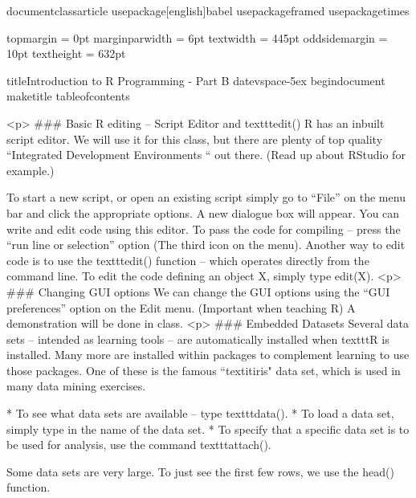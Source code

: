 documentclass{article}
usepackage[english]{babel}
usepackage{framed}
usepackage{times}

topmargin = 0pt
marginparwidth = 6pt
textwidth = 445pt
oddsidemargin = 10pt
textheight = 632pt

title{Introduction to R Programming - Part B}
date{vspace{-5ex}}
begin{document}
maketitle
tableofcontents

<p>
### {Basic R editing – Script Editor and texttt{edit()}}
R has an inbuilt script editor. We will use it for this class, but there are plenty of top quality “Integrated Development Environments “ out there. (Read up about RStudio for  example.)

To start a new script, or open an existing script simply go to “File” on the menu bar and click the appropriate options.
A new dialogue box will appear. You can write and edit code using this editor.
To pass the code for compiling – press the “run line or selection” option (The third icon on the menu).
Another way to edit code is to use the texttt{edit()} function – which operates directly from the command line.  To edit the code defining an object X, simply type edit(X).
<p>
### {Changing GUI options}
We can change the GUI options using the “GUI preferences” option on the Edit menu. (Important when teaching R)
A demonstration will be done in class. 
<p>
### {Embedded Datasets}
Several data sets – intended as learning tools – are automatically installed when texttt{R} is installed. Many more are installed within packages to complement learning to use those packages.  One of these is the famous ``textit{iris}" data set, which is used in many data mining exercises.

         * To see what data sets are available – type texttt{data()}.
         * To load a data set, simply type in the name of the data set. 
         * To specify that a specific data set is to be used for analysis, use the command texttt{attach()}.



Some data sets are very large. To just see the first few rows, we use the head() function.

